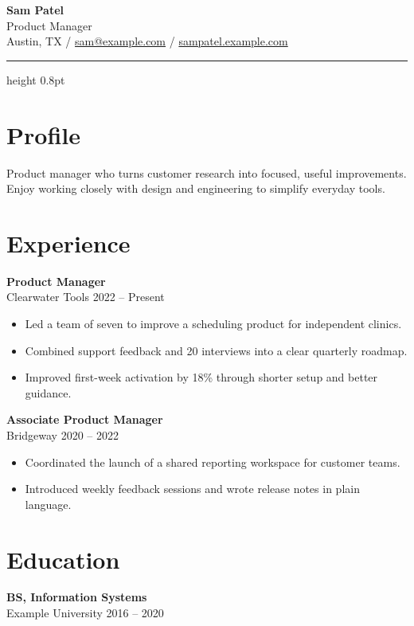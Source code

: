 \documentclass[10pt,a4paper]{article}
\begin{document}
{\Huge\bfseries Sam Patel}\\[5pt]
{\large Product Manager}\\[7pt]
Austin, TX \enspace / \enspace
\href{mailto:sam@example.com}{sam@example.com} \enspace / \enspace
\href{https://example.com}{sampatel.example.com}\\[9pt]
{\color{ink}\hrule height 0.8pt}
\vspace{5pt}

\begin{minipage}[t]{0.64\textwidth}
\setlength{\parskip}{5pt}
\vspace{0pt}
\section{Profile}
Product manager who turns customer research into focused, useful improvements.
Enjoy working closely with design and engineering to simplify everyday tools.

\section{Experience}
\textbf{Product Manager}\\
Clearwater Tools \hfill 2022 -- Present
\begin{itemize}
  \item Led a team of seven to improve a scheduling product for independent clinics.
  \item Combined support feedback and 20 interviews into a clear quarterly roadmap.
  \item Improved first-week activation by 18\% through shorter setup and better guidance.
\end{itemize}
\textbf{Associate Product Manager}\\
Bridgeway \hfill 2020 -- 2022
\begin{itemize}
  \item Coordinated the launch of a shared reporting workspace for customer teams.
  \item Introduced weekly feedback sessions and wrote release notes in plain language.
\end{itemize}

\section{Education}
\textbf{BS, Information Systems}\\
Example University \hfill 2016 -- 2020
\end{minipage}\hfill
\end{document}
